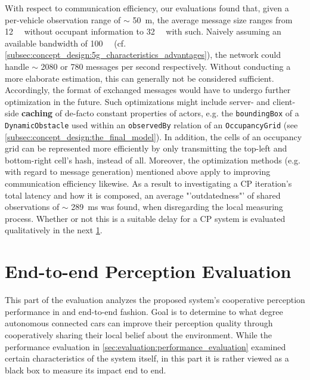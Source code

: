 With respect to communication efficiency, our evaluations found that, given a per-vehicle observation range of $\sim$ \SI{50}{\meter}, the average message size ranges from \SI{12}{\kilo\byte} without occupant information to \SI{32}{\kilo\byte} with such. Naively assuming an available bandwidth of \SI{100}{\mega\bit} (cf. \cref{subsec:concept_design:5g_characteristics_advantages}), the network could handle $\sim$ 2080 or 780 messages per second respectively. Without conducting a more elaborate estimation, this can generally not be considered sufficient. Accordingly, the format of exchanged messages would have to undergo further optimization in the future. Such optimizations might include server- and client-side \textbf{caching} of de-facto constant properties of actors, e.g. the \texttt{boundingBox} of a \texttt{DynamicObstacle} used within an \texttt{observedBy} relation of an \texttt{OccupancyGrid} (see \cref{subsec:concept_design:the_final_model}). In addition, the cells of an occupancy grid can be represented more efficiently by only transmitting the top-left and bottom-right cell's hash, instead of all. Moreover, the optimization methods (e.g. with regard to message generation) mentioned above apply to improving communication efficiency likewise. As a result to investigating a CP iteration's total latency and how it is composed, an average "'outdatedness"' of shared observations of $\sim$ \SI{289}{\milli\second} was found, when disregarding the local measuring process. Whether or not this is a suitable delay for a CP system is evaluated qualitatively in the next \cref{sec:evaluation:perception_evaluation}.

\section{End-to-end Perception Evaluation}
\label{sec:evaluation:perception_evaluation}
This part of the evaluation analyzes the proposed system's cooperative perception performance in and end-to-end fashion. Goal is to determine to what degree autonomous connected cars can improve their perception quality through cooperatively sharing their local belief about the environment. While the performance evaluation in \cref{sec:evaluation:performance_evaluation} examined certain characteristics of the system itself, in this part it is rather viewed as a black box to measure its impact end to end. 
\par
\bigskip

